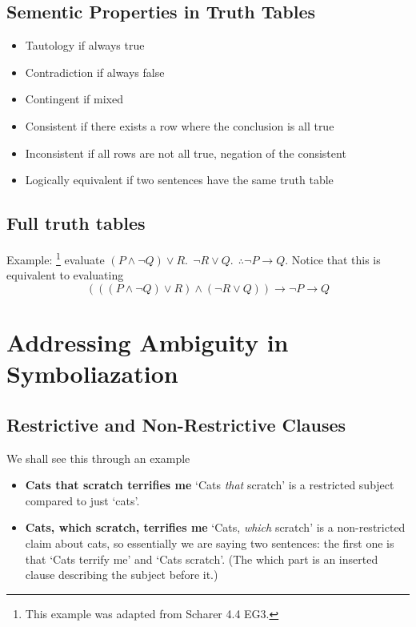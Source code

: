 \documentclass[10pt]{article}
\renewcommand{\implies}{\rightarrow}
\begin{document}
\subsection{Sementic Properties in Truth Tables}
\begin{itemize}
    \item Tautology if always true
    \item Contradiction if always false 
    \item Contingent if mixed
    \item Consistent if there exists a row where the conclusion is all true
    \item Inconsistent if all rows are not all true, negation of the consistent
    \item Logically equivalent if two sentences have the same truth table
\end{itemize}



\subsection{Full truth tables}
Example: \footnote{This example was adapted from Scharer 4.4 EG3.}
evaluate $(P\land \neg Q)\vee R. ~~\neg R\vee Q. ~~\therefore \neg P\implies Q$. 
Notice that this is equivalent to evaluating
\begin{equation*}
    \left(\left(\left(P\land \neg Q\right)\vee R \right) \land 
    \left(\neg R\vee Q\right)\right) \implies \neg P\implies Q
\end{equation*}


\section{Addressing Ambiguity in Symboliazation}
\subsection{Restrictive and Non-Restrictive Clauses}
We shall see this through an example
\begin{itemize}
    \item \textbf{Cats that scratch terrifies me} `Cats \textit{that} scratch' 
    is a restricted subject compared to just `cats'.
    \item \textbf{Cats, which scratch, terrifies me} `Cats, \textit{which} scratch'
    is a non-restricted claim about cats, so essentially we are saying two sentences:
    the first one is that `Cats terrify me' and `Cats scratch'. (The which part 
    is an inserted clause describing the subject before it.)
\end{itemize}
\end{document}
